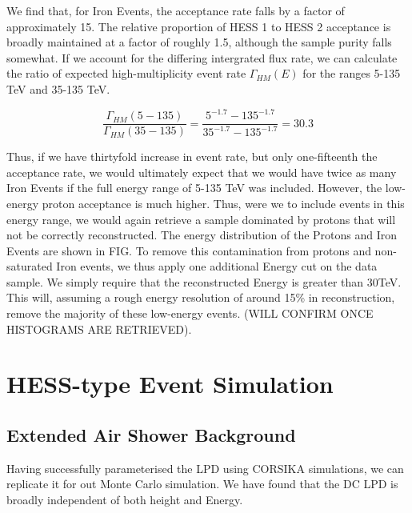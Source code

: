 \documentclass[11pt]{article}
\begin{document}
We find that, for Iron Events, the acceptance rate falls by a factor of approximately 15. The relative proportion of HESS 1 to HESS 2 acceptance is broadly maintained at a factor of roughly 1.5, although the sample purity falls somewhat. If we account for the differing intergrated flux rate, we can calculate the ratio of expected high-multiplicity event rate $\Gamma_{HM}(E)$ for the ranges 5-135 TeV and 35-135 TeV.

\[ \frac{\Gamma_{HM}(5-135)}{\Gamma_{HM}(35-135)} = \frac{5^{-1.7} - 135^{-1.7}}{35^{-1.7} - 135^{-1.7}} 
= 30.3 \]

Thus, if we have thirtyfold increase in event rate, but only one-fifteenth the acceptance rate, we would ultimately expect that we would have twice as many Iron Events if the full energy range of 5-135 TeV was included. However, the low-energy proton acceptance is much higher. Thus, were we to include events in this energy range, we would again retrieve a sample dominated by protons that will not be correctly reconstructed. The energy distribution of the Protons and Iron Events are shown in FIG. To remove this contamination from protons and non-saturated Iron events, we thus apply one additional Energy cut on the data sample. We simply require that the reconstructed Energy is greater than 30TeV. This will, assuming a rough energy resolution of around 15\% in reconstruction, remove the majority of these low-energy events. (WILL CONFIRM ONCE HISTOGRAMS ARE RETRIEVED). 

\section{HESS-type Event Simulation}

\subsection{Extended Air Shower Background}
Having successfully parameterised the LPD using CORSIKA simulations, we can replicate it for out Monte Carlo simulation. We have found that the DC LPD is broadly independent of both height and Energy. 
\end{document}
